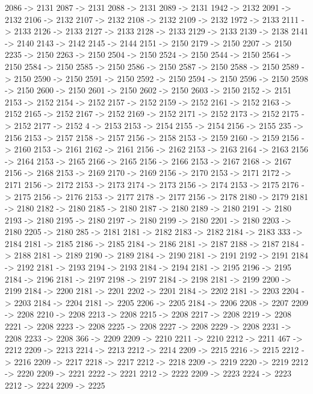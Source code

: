{	2086 -> 2131
	2087 -> 2131
	2088 -> 2131
	2089 -> 2131
	1942 -> 2132
	2091 -> 2132
	2106 -> 2132
	2107 -> 2132
	2108 -> 2132
	2109 -> 2132
	1972 -> 2133
	2111 -> 2133
	2126 -> 2133
	2127 -> 2133
	2128 -> 2133
	2129 -> 2133
	2139 -> 2138
	2141 -> 2140
	2143 -> 2142
	2145 -> 2144
	2151 -> 2150
	2179 -> 2150
	2207 -> 2150
	2235 -> 2150
	2263 -> 2150
	2504 -> 2150
	2524 -> 2150
	2544 -> 2150
	2564 -> 2150
	2584 -> 2150
	2585 -> 2150
	2586 -> 2150
	2587 -> 2150
	2588 -> 2150
	2589 -> 2150
	2590 -> 2150
	2591 -> 2150
	2592 -> 2150
	2594 -> 2150
	2596 -> 2150
	2598 -> 2150
	2600 -> 2150
	2601 -> 2150
	2602 -> 2150
	2603 -> 2150
	2152 -> 2151
	2153 -> 2152
	2154 -> 2152
	2157 -> 2152
	2159 -> 2152
	2161 -> 2152
	2163 -> 2152
	2165 -> 2152
	2167 -> 2152
	2169 -> 2152
	2171 -> 2152
	2173 -> 2152
	2175 -> 2152
	2177 -> 2152
	4 -> 2153
	2153 -> 2154
	2155 -> 2154
	2156 -> 2155
	235 -> 2156
	2153 -> 2157
	2158 -> 2157
	2156 -> 2158
	2153 -> 2159
	2160 -> 2159
	2156 -> 2160
	2153 -> 2161
	2162 -> 2161
	2156 -> 2162
	2153 -> 2163
	2164 -> 2163
	2156 -> 2164
	2153 -> 2165
	2166 -> 2165
	2156 -> 2166
	2153 -> 2167
	2168 -> 2167
	2156 -> 2168
	2153 -> 2169
	2170 -> 2169
	2156 -> 2170
	2153 -> 2171
	2172 -> 2171
	2156 -> 2172
	2153 -> 2173
	2174 -> 2173
	2156 -> 2174
	2153 -> 2175
	2176 -> 2175
	2156 -> 2176
	2153 -> 2177
	2178 -> 2177
	2156 -> 2178
	2180 -> 2179
	2181 -> 2180
	2182 -> 2180
	2185 -> 2180
	2187 -> 2180
	2189 -> 2180
	2191 -> 2180
	2193 -> 2180
	2195 -> 2180
	2197 -> 2180
	2199 -> 2180
	2201 -> 2180
	2203 -> 2180
	2205 -> 2180
	285 -> 2181
	2181 -> 2182
	2183 -> 2182
	2184 -> 2183
	333 -> 2184
	2181 -> 2185
	2186 -> 2185
	2184 -> 2186
	2181 -> 2187
	2188 -> 2187
	2184 -> 2188
	2181 -> 2189
	2190 -> 2189
	2184 -> 2190
	2181 -> 2191
	2192 -> 2191
	2184 -> 2192
	2181 -> 2193
	2194 -> 2193
	2184 -> 2194
	2181 -> 2195
	2196 -> 2195
	2184 -> 2196
	2181 -> 2197
	2198 -> 2197
	2184 -> 2198
	2181 -> 2199
	2200 -> 2199
	2184 -> 2200
	2181 -> 2201
	2202 -> 2201
	2184 -> 2202
	2181 -> 2203
	2204 -> 2203
	2184 -> 2204
	2181 -> 2205
	2206 -> 2205
	2184 -> 2206
	2208 -> 2207
	2209 -> 2208
	2210 -> 2208
	2213 -> 2208
	2215 -> 2208
	2217 -> 2208
	2219 -> 2208
	2221 -> 2208
	2223 -> 2208
	2225 -> 2208
	2227 -> 2208
	2229 -> 2208
	2231 -> 2208
	2233 -> 2208
	366 -> 2209
	2209 -> 2210
	2211 -> 2210
	2212 -> 2211
	467 -> 2212
	2209 -> 2213
	2214 -> 2213
	2212 -> 2214
	2209 -> 2215
	2216 -> 2215
	2212 -> 2216
	2209 -> 2217
	2218 -> 2217
	2212 -> 2218
	2209 -> 2219
	2220 -> 2219
	2212 -> 2220
	2209 -> 2221
	2222 -> 2221
	2212 -> 2222
	2209 -> 2223
	2224 -> 2223
	2212 -> 2224
	2209 -> 2225
}
